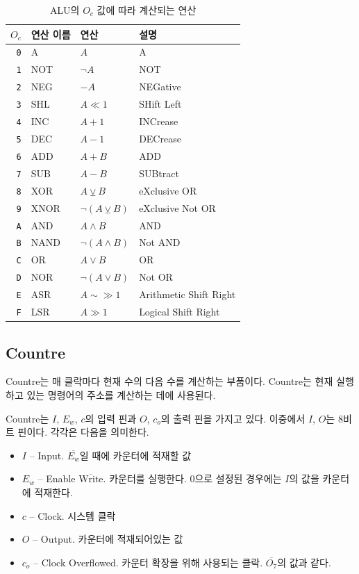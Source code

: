 \documentclass{article}
\begin{document}
\begin{table}
    \centering
    \begin{tabular}{rl|ll}
        $O_c$ & 연산 이름 & 연산 & 설명\\
        \hline
        \texttt 0 & A    & $A$ & A \\
        \texttt 1 & NOT  & $\neg A$ & NOT \\
        \texttt 2 & NEG  & $- A$ & NEGative \\
        \texttt 3 & SHL  & $A \ll 1$ & SHift Left \\
        \texttt 4 & INC  & $A + 1$ & INCrease \\
        \texttt 5 & DEC  & $A - 1$ & DECrease \\
        \texttt 6 & ADD  & $A + B$ & ADD \\
        \texttt 7 & SUB  & $A - B$ & SUBtract \\
        \texttt 8 & XOR  & $A \veebar B$ & eXclusive OR \\
        \texttt 9 & XNOR & $\neg (A \veebar B)$ & eXclusive Not OR \\
        \texttt A & AND  & $A \wedge B$ & AND \\
        \texttt B & NAND & $\neg (A \wedge B)$ & Not AND \\
        \texttt C & OR   & $A \vee B$ & OR \\
        \texttt D & NOR  & $\neg (A \vee B)$ & Not OR \\
        \texttt E & ASR  & $A \sim\gg 1$ & Arithmetic Shift Right \\
        \texttt F & LSR  & $A \gg 1$ & Logical Shift Right \\
    \end{tabular}
    \caption{ALU의 $O_c$ 값에 따라 계산되는 연산}
    \label{tab:aluopc}
\end{table}

\pagebreak

\subsection{Countre}

Countre는 매 클락마다 현재 수의 다음 수를 계산하는 부품이다.
Countre는 현재 실행하고 있는 명령어의 주소를 계산하는 데에 사용된다.

Countre는 $I$, $E_w$, $\textit{c}$의 입력 핀과
$O$, $c_o$의 출력 핀을 가지고 있다.
이중에서 $I$, $O$는 8비트 핀이다.
각각은 다음을 의미한다.

\begin{itemize}
    \item $I$ -- Input. $\overline{E_w}$일 때에 카운터에 적재할 값
    \item $E_w$ -- Enable $\overline{\textrm{Write}}$. 카운터를 실행한다.
        0으로 설정된 경우에는 $I$의 값을 카운터에 적재한다.
    \item $c$ -- Clock. 시스템 클락
    \item $O$ -- Output. 카운터에 적재되어있는 값
    \item $c_o$ -- Clock Overflowed. 카운터 확장을 위해 사용되는 클락.
        $\overline{O_7}$의 값과 같다.
\end{itemize}
\end{document}
